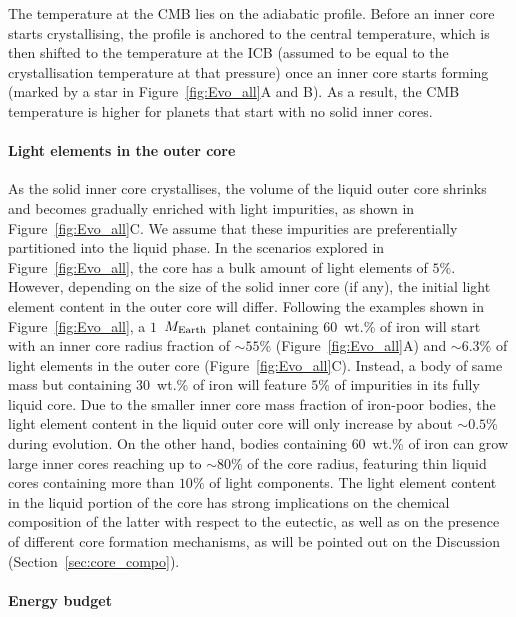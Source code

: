 \documentclass[draft]{agujournal2019} %
\begin{document}
The temperature at the CMB lies on the adiabatic profile. Before an inner core starts crystallising, the profile is anchored to the central temperature, which is then shifted to the temperature at the ICB (assumed to be equal to the crystallisation temperature at that pressure) once an inner core starts forming (marked by a star in Figure~\ref{fig:Evo_all}A and B). As a result, the CMB temperature is higher for planets that start with no solid inner cores. 

\paragraph*{Light elements in the outer core}
As the solid inner core crystallises, the volume of the liquid outer core shrinks and becomes gradually enriched with light impurities, as shown in Figure~\ref{fig:Evo_all}C. We assume that these impurities are preferentially partitioned into the liquid phase. In the scenarios explored in Figure~\ref{fig:Evo_all}, the core has a bulk amount of light elements of $5\%$. However, depending on the size of the solid inner core (if any), the initial light element content in the outer core will differ. Following the examples shown in Figure~\ref{fig:Evo_all}, a $1$~$M_{\rm Earth}$ planet containing $60$~wt.\% of iron will start with an inner core radius fraction of $\sim 55$\% (Figure~\ref{fig:Evo_all}A) and  $\sim 6.3$\% of light elements in the outer core (Figure~\ref{fig:Evo_all}C). Instead, a body of same mass but containing $30$~wt.\% of iron will feature $5$\% of impurities in its fully liquid core. Due to the smaller inner core mass fraction of iron-poor bodies, the light element content in the liquid outer core will only increase by about $\sim 0.5$\% during evolution. On the other hand, bodies containing $60$~wt.\% of iron can grow large inner cores reaching up to $\sim 80\%$ of the core radius, featuring thin liquid cores containing more than $10\%$ of light components. The light element content in the liquid portion of the core has strong implications on the chemical composition of the latter with respect to the eutectic, as well as on the presence of different core formation mechanisms, as will be pointed out on the Discussion (Section~\ref{sec:core_compo}).

\paragraph*{Energy budget}
\end{document}
